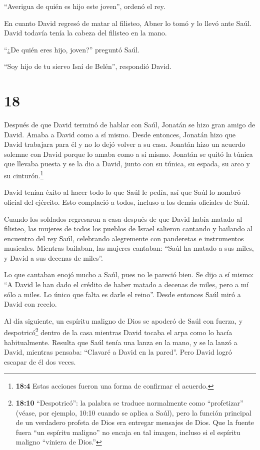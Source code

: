  ``Averigua de quién es hijo este joven'', ordenó el rey.

 En cuanto David regresó de matar al filisteo, Abner lo
tomó y lo llevó ante Saúl. David todavía tenía la cabeza del filisteo en
la mano.

 ``¿De quién eres hijo, joven?'' preguntó Saúl.

``Soy hijo de tu siervo Isaí de Belén'', respondió David.

\hypertarget{section-17}{%
\section{18}\label{section-17}}

 Después de que David terminó de hablar con Saúl, Jonatán se
hizo gran amigo de David. Amaba a David como a sí mismo. 
Desde entonces, Jonatán hizo que David trabajara para él y no lo dejó
volver a su casa.  Jonatán hizo un acuerdo solemne con David
porque lo amaba como a sí mismo.  Jonatán se quitó la túnica
que llevaba puesta y se la dio a David, junto con su túnica, su espada,
su arco y su cinturón.\footnote{\textbf{18:4} Estas acciones fueron una
  forma de confirmar el acuerdo.}

 David tenían éxito al hacer todo lo que Saúl le pedía, así
que Saúl lo nombró oficial del ejército. Esto complació a todos, incluso
a los demás oficiales de Saúl.

 Cuando los soldados regresaron a casa después de que David
había matado al filisteo, las mujeres de todos los pueblos de Israel
salieron cantando y bailando al encuentro del rey Saúl, celebrando
alegremente con panderetas e instrumentos musicales. 
Mientras bailaban, las mujeres cantaban: ``Saúl ha matado a sus miles, y
David a sus decenas de miles''.

 Lo que cantaban enojó mucho a Saúl, pues no le pareció
bien. Se dijo a sí mismo: ``A David le han dado el crédito de haber
matado a decenas de miles, pero a mí sólo a miles. Lo único que falta es
darle el reino''.  Desde entonces Saúl miró a David con
recelo.

 Al día siguiente, un espíritu maligno de Dios se apoderó
de Saúl con fuerza, y despotricó\footnote{\textbf{18:10} ``Despotricó'':
  la palabra se traduce normalmente como ``profetizar'' (véase, por
  ejemplo, 10:10 cuando se aplica a Saúl), pero la función principal de
  un verdadero profeta de Dios era entregar mensajes de Dios. Que la
  fuente fuera ``un espíritu maligno'' no encaja en tal imagen, incluso
  si el espíritu maligno ``viniera de Dios.''} dentro de la casa
mientras David tocaba el arpa como lo hacía habitualmente. Resulta que
Saúl tenía una lanza en la mano,  y se la lanzó a David,
mientras pensaba: ``Clavaré a David en la pared''. Pero David logró
escapar de él dos veces.

